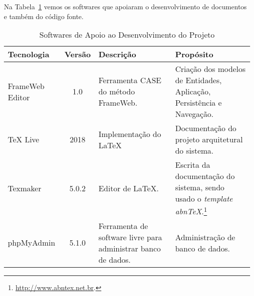 
\newpage
Na Tabela~\ref{tabela-software} vemos os softwares que apoiaram o desenvolvimento de documentos e também do código fonte.

\begin{table}[h]
	\centering	
	\vspace{0.5cm}
	\caption{Softwares de Apoio ao Desenvolvimento do Projeto}	
	\label{tabela-software}
	\begin{tabular}{|p{3cm}|c|p{5cm}|p{6cm}|}  \hline 
	
 		\rowcolor[rgb]{0.8,0.8,0.8} Tecnologia & Versão & Descrição & Propósito \\\hline 
 		 
		FrameWeb Editor & 1.0 & Ferramenta CASE do método FrameWeb. & Criação dos modelos de Entidades, Aplicação, Persistência e Navegação. \\\hline

		TeX Live  & 2018 & Implementação do \LaTeX & Documentação do projeto arquitetural do sistema. \\\hline       
		
		Texmaker & 5.0.2 & Editor de \LaTeX. &  Escrita da documentação do sistema, sendo usado o \textit{template} \textit{abnTeX}.\footnote{\url{http://www.abntex.net.br}.} \\\hline    

		phpMyAdmin & 5.1.0 & Ferramenta de software livre para administrar banco de dados. & Administração de banco de dados. \\\hline 
		
	\end{tabular}
\end{table}

